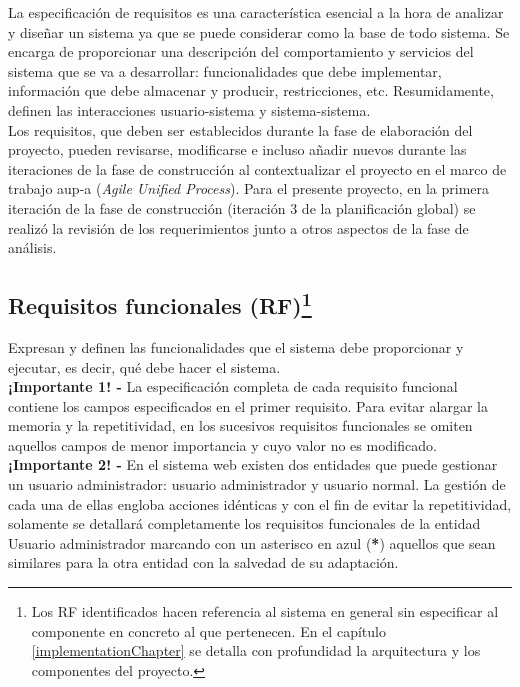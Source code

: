 \documentclass[12pt,a4paper, twoside]{report}
\begin{document}
	La especificación de requisitos es una característica esencial a la hora de analizar y diseñar un sistema ya que se puede considerar como la base de todo sistema. Se encarga de proporcionar una descripción del comportamiento y servicios del sistema que se va a desarrollar: funcionalidades que debe implementar, información que debe almacenar y producir, restricciones, etc. Resumidamente, definen las interacciones usuario-sistema y sistema-sistema.\\
	
	Los requisitos, que deben ser establecidos durante la fase de elaboración del proyecto, pueden revisarse, modificarse e incluso añadir nuevos durante las iteraciones de la fase de construcción al contextualizar el proyecto en el marco de trabajo \gls{aup-a} (\textit{Agile Unified Process}). Para el presente proyecto, en la primera iteración de la fase de construcción (iteración 3 de la planificación global) se realizó la revisión de los requerimientos junto a otros aspectos de la fase de análisis.

	\subsection[Requisitos funcionales (RF)]{Requisitos funcionales (RF)\footnote{Los RF identificados hacen referencia al sistema en general sin especificar al componente en concreto al que pertenecen. En el capítulo \ref{implementationChapter} se detalla con profundidad la arquitectura y los componentes del proyecto.}}
	
	Expresan y definen las funcionalidades que el sistema debe proporcionar y ejecutar, es decir, qué debe hacer el sistema. \\
	
	\textbf{¡Importante 1! -} La especificación completa de cada requisito funcional contiene los campos especificados en el primer requisito. Para evitar alargar la memoria y la repetitividad, en los sucesivos requisitos funcionales se omiten aquellos campos de menor importancia y cuyo valor no es modificado. \\

	\textbf{¡Importante 2! -} En el sistema web existen dos entidades que puede gestionar un usuario administrador: usuario administrador y usuario normal. La gestión de cada una de ellas engloba acciones idénticas y con el fin de evitar la repetitividad, solamente se detallará completamente los requisitos funcionales de la entidad Usuario administrador marcando con un asterisco en azul (\textbf{{\color{black!40!blue}*}}) aquellos que sean similares para la otra entidad con la salvedad de su adaptación. \\
	
\end{document}
